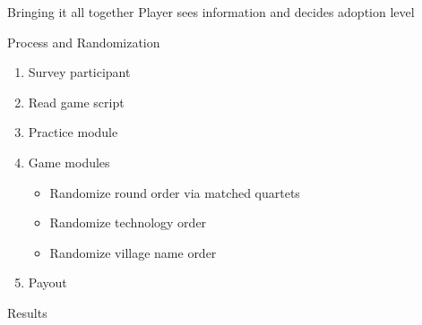 \documentclass[
  ignorenonframetext,
]{beamer}
\providecommand{\tightlist}{%
  \setlength{\itemsep}{0pt}\setlength{\parskip}{0pt}}\usepackage{longtable,booktabs,array}
\begin{document}
\begin{frame}{Bringing it all together}
\protect\hypertarget{bringing-it-all-together}{}
Player sees information and decides adoption level

\begin{figure}

\begin{minipage}[t]{0.50\linewidth}

{\centering 


}

\end{minipage}%
%
\begin{minipage}[t]{0.50\linewidth}

{\centering 


}

\end{minipage}%

\end{figure}
\end{frame}

\begin{frame}{Process and Randomization}
\protect\hypertarget{process-and-randomization}{}
\begin{enumerate}[<+->]
[(1)]
\tightlist
\item
  Survey participant
\item
  Read game script
\item
  Practice module
\item
  Game modules

  \begin{itemize}[<+->]
  \tightlist
  \item
    Randomize round order via matched quartets
  \item
    Randomize technology order
  \item
    Randomize village name order
  \end{itemize}
\item
  Payout
\end{enumerate}
\end{frame}

\begin{frame}{Results}
\protect\hypertarget{results}{}
\end{frame}
\end{document}
